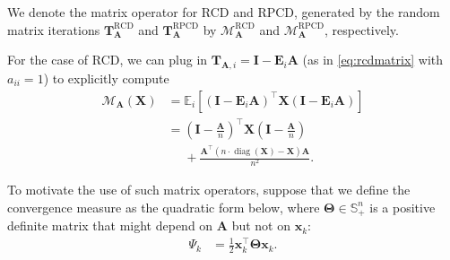 \documentclass{article}
\theoremstyle{plain}
\theoremstyle{definition}
\theoremstyle{remark}
\def\norm#1{\lVert#1\rVert}
\def\bigopen#1{\left(#1\right)}
\def\bigclosed#1{\left[#1\right]}
\newcommand{\mTheta}{\bm{\Theta}}
\newcommand{\RCD}{\text{RCD}} %
\newcommand{\RPCD}{\text{RPCD}} %
\newcommand{\MARCD}{\mathcal{M}_{\bm{A}}^{\RCD}} %
\newcommand{\MARPCD}{\mathcal{M}_{\bm{A}}^{\RPCD}} %
\def\vx{{\bm{x}}}
\def\vy{{\bm{y}}}
\def\mA{{\bm{A}}}
\def\mE{{\bm{E}}}
\def\mI{{\bm{I}}}
\def\mT{{\bm{T}}}
\def\mX{{\bm{X}}}
\def\gM{{\mathcal{M}}}
\def\sS{{\mathbb{S}}}
\newcommand{\E}{\mathbb{E}}
\DeclareMathOperator{\diag}{diag}
\begin{document}
We denote the matrix operator for RCD and RPCD, generated by the random matrix iterations $\mT_{\mA}^{\text{RCD}}$ and $\mT_{\mA}^{\text{RPCD}}$ by $\MARCD$ and $\MARPCD$, respectively.

For the case of RCD, we can plug in $\mT_{\mA, i} = \mI - \mE_i \mA$ (as in \eqref{eq:rcdmatrix} with $a_{ii} = 1$) to explicitly compute
\begin{align*}
    \gM_{\mA}(\mX) &= \E_{i} \bigclosed{(\mI - \mE_i \mA)^{\top} \mX (\mI - \mE_i \mA)} \\
    &= \bigopen{\mI - \frac{\mA}{n}}^{\top} \mX \bigopen{\mI - \frac{\mA}{n}} \\
    &\phantom{{}={}} + \frac{\mA^{\top} (n\cdot \diag(\mX) - \mX) \mA}{n^2}.
\end{align*}

To motivate the use of such matrix operators,
suppose that we define the convergence measure as the quadratic form below, where $\mTheta \in \sS_{+}^{n}$ is a positive definite matrix that might depend on $\mA$ but not on $\vx_k$:
\begin{align}
    \Psi_k &= \frac{1}{2} \vx_{k}^{\top} \mTheta \vx_{k}. \label{eq:Theta}
\end{align}
\end{document}
